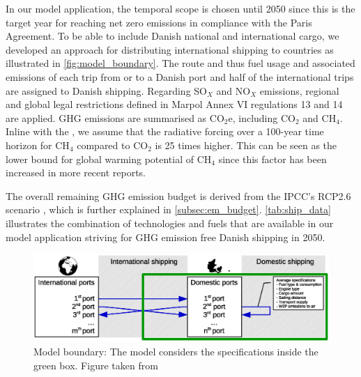 \documentclass[article]{elsarticle}
\begin{document}
In our model application, the temporal scope is chosen until 2050 since this is the target year for reaching net zero emissions in compliance with the Paris Agreement. To be able to include Danish national and international cargo, we developed an approach for distributing international shipping to countries as illustrated in \autoref{fig:model_boundary}. The route and thus fuel usage and associated emissions of each trip from or to a Danish port and half of the international trips are assigned to Danish shipping. Regarding SO$_X$ and NO$_X$ emissions, regional and global legal restrictions defined in Marpol Annex VI regulations 13 and 14 \cite{IMO2008a,IMO2008b} are applied. GHG emissions are summarised as CO$_2$e, including CO$_2$ and CH$_4$. Inline with the \citet{IPCC2007}, we assume that the radiative forcing over a 100-year time horizon for CH$_4$ compared to CO$_2$ is 25 times higher. This can be seen as the lower bound for global warming potential of CH$_4$ since this factor has been increased in more recent reports.

The overall remaining GHG emission budget is derived from the IPCC's RCP2.6 scenario \cite[p.~27]{IPCC2013}, which is further explained in \autoref{subsec:em_budget}. \autoref{tab:ship_data} illustrates the combination of technologies and fuels that are available in our model application striving for GHG emission free Danish shipping in 2050.

\begin{figure}[htb]
    \centering
    \includegraphics[width=\textwidth]{figures/model_boundary_paper.eps}
    \caption{Model boundary: The model considers the specifications inside the green box. Figure taken from \cite{Thesis2018}}
    \label{fig:model_boundary}
\end{figure}
\end{document}
